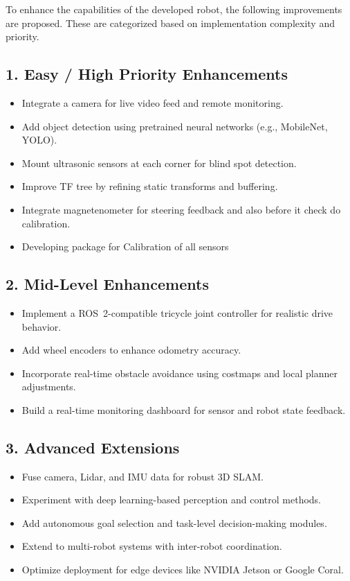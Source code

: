 \documentclass[english,project]{buwthesis}
\begin{document}
To enhance the capabilities of the developed robot, the following improvements are proposed. These are categorized based on implementation complexity and priority.

\subsection*{1. Easy / High Priority Enhancements}
\begin{itemize}
    \item Integrate a camera for live video feed and remote monitoring.
    \item Add object detection using pretrained neural networks (e.g., MobileNet, YOLO).
    \item Mount ultrasonic sensors at each corner for blind spot detection.
    \item Improve TF tree by refining static transforms and buffering.
    \item Integrate magnetenometer for steering feedback and also before it check do calibration.
    \item Developing package for Calibration of all sensors
\end{itemize}

\subsection*{2. Mid-Level Enhancements}
\begin{itemize}
    \item Implement a ROS~2-compatible tricycle joint controller for realistic drive behavior.
    \item Add wheel encoders to enhance odometry accuracy.
    \item Incorporate real-time obstacle avoidance using costmaps and local planner adjustments.
    \item Build a real-time monitoring dashboard for sensor and robot state feedback.
\end{itemize}

\subsection*{3. Advanced  Extensions}
\begin{itemize}
    \item Fuse camera, Lidar, and IMU data for robust 3D SLAM.
    \item Experiment with deep learning-based perception and control methods.
    \item Add autonomous goal selection and task-level decision-making modules.
    \item Extend to multi-robot systems with inter-robot coordination.
    \item Optimize deployment for edge devices like NVIDIA Jetson or Google Coral.
\end{itemize}
\end{document}
